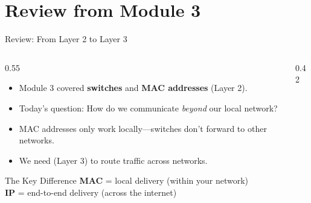 \documentclass[aspectratio=169]{beamer}  %
\begin{document}
\section*{Review from Module 3}

\begin{frame}{Review: From Layer 2 to Layer 3}
    \begin{columns}[T]
        \begin{column}{0.55\textwidth}
            \begin{itemize}
                \item Module 3 covered \textbf{switches} and \textbf{MAC addresses} (Layer 2).
                \item Today's question: How do we communicate \textit{beyond} our local network?
                \item MAC addresses only work locally---switches don't forward to other networks.
                \item We need  (Layer 3) to route traffic across networks.
            \end{itemize}
            
            \vspace{0.3em}
            \begin{alertblock}{The Key Difference}
                \textbf{MAC} = local delivery (within your network) \\
                \textbf{IP} = end-to-end delivery (across the internet)
            \end{alertblock}
        \end{column}
        \begin{column}{0.42\textwidth}
            \begin{center}
\end{center}
\end{column}
\end{columns}
\end{frame}
\end{document}
